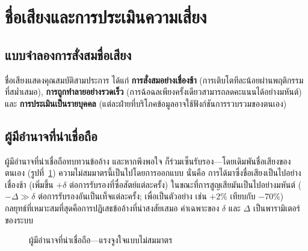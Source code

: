 \documentclass[11pt,a4paper,twocolumn]{article}
\begin{document}
\section{ชื่อเสียงและการประเมินความเสี่ยง}

\subsection{แบบจำลองการสั่งสมชื่อเสียง}

ชื่อเสียงแสดงคุณสมบัติสามประการ ได้แก่ \textbf{การสั่งสมอย่างเชื่องช้า} (การเติบโตทีละน้อยผ่านพฤติกรรมที่สม่ำเสมอ), \textbf{การถูกทำลายอย่างรวดเร็ว} (การฉ้อฉลเพียงครั้งเดียวสามารถลดคะแนนได้อย่างมหันต์) และ \textbf{การประเมินเป็นรายบุคคล} (แต่ละฝ่ายที่บริโภคข้อมูลอาจใช้ฟังก์ชันการรวบรวมของตนเอง)

\subsection{ผู้มีอำนาจที่น่าเชื่อถือ}

ผู้มีอำนาจที่น่าเชื่อถือทบทวนข้ออ้าง และหากพึงพอใจ ก็ร่วมเซ็นรับรอง---โดยเดิมพันชื่อเสียงของตนเอง (รูปที่~\ref{fig:authority}) ความไม่สมมาตรนี้เป็นไปโดยการออกแบบ นั่นคือ การได้มาซึ่งชื่อเสียงเป็นไปอย่างเชื่องช้า (เพิ่มขึ้น $+\delta$ ต่อการรับรองที่ซื่อสัตย์แต่ละครั้ง) ในขณะที่การสูญเสียมันเป็นไปอย่างมหันต์ ($-\Delta \gg \delta$ ต่อการรับรองอันเป็นเท็จแต่ละครั้ง; เพื่อเป็นตัวอย่าง เช่น $+2\%$ เทียบกับ $-70\%$) กลยุทธ์ที่เหมาะสมที่สุดคือการปฏิเสธข้ออ้างที่น่าสงสัยเสมอ ค่าเฉพาะของ $\delta$ และ $\Delta$ เป็นพารามิเตอร์ของระบบ

\begin{figure}[ht]
\centering
{}
\caption{ผู้มีอำนาจที่น่าเชื่อถือ---แรงจูงใจแบบไม่สมมาตร}
\label{fig:authority}
\end{figure}
\end{document}
